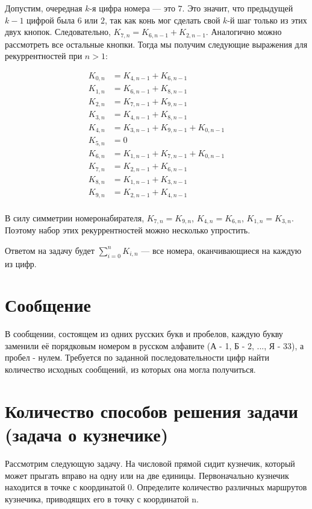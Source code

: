 Допустим, очередная $k$-я цифра номера --- это $7$. Это значит, что предыдущей $k-1$ цифрой
была $6$ или $2$, так как конь мог сделать свой $k$-й шаг только из этих двух кнопок.
Следовательно, $K_{7,n} = K_{6,n-1} + K_{2,n-1}$. Аналогично можно рассмотреть все остальные
кнопки. Тогда мы получим следующие выражения для рекуррентностей при $n > 1$:

\begin{align*}
K_{0,n} &= K_{4,n-1} + K_{6,n-1} \\
K_{1,n} &= K_{6,n-1} + K_{8,n-1} \\
K_{2,n} &= K_{7,n-1} + K_{9,n-1} \\
K_{3,n} &= K_{4,n-1} + K_{8,n-1} \\
K_{4,n} &= K_{3,n-1} + K_{9,n-1} + K_{0,n-1} \\
K_{5,n} &= 0 \\
K_{6,n} &= K_{1,n-1} + K_{7,n-1} + K_{0,n-1} \\
K_{7,n} &= K_{2,n-1} + K_{6,n-1} \\
K_{8,n} &= K_{1,n-1} + K_{3,n-1} \\
K_{9,n} &= K_{2,n-1} + K_{4,n-1} \\
\end{align*}

В силу симметрии номеронабирателя, $K_{7,n} = K_{9,n}$, $K_{4,n} = K_{6,n}$, $K_{1,n} = K_{3,n}$.
Поэтому набор этих рекуррентностей можно несколько упростить.

Ответом на задачу будет $\sum_{i=0}^{n}K_{i,n}$ --- все номера, оканчивающиеся на каждую из цифр.

\section{Сообщение}

В сообщении, состоящем из одних русских букв и пробелов, каждую букву заменили
её порядковым номером в русском алфавите (А - 1, Б - 2, ..., Я - 33), а пробел
- нулем. Требуется по заданной последовательности цифр найти количество
исходных сообщений, из которых она могла получиться.



\section{Количество способов решения задачи (задача о кузнечике)}

Рассмотрим следующую задачу. На числовой прямой сидит кузнечик, который может прыгать вправо на одну или на две единицы. Первоначально кузнечик находится в точке с координатой 0. Определите количество различных маршрутов кузнечика, приводящих его в точку с координатой n.

